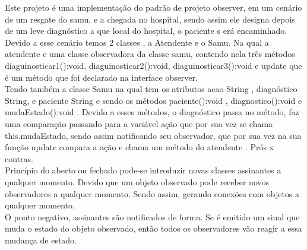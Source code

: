 \documentclass[a4paper]{article}
\begin{document}
          Este projeto é uma implementação do padrão de projeto observer, em um 
          cenário de um resgate do samu, e a chegada no hospital, sendo assim ele
          designa depois de um leve diagnóstico a que local do hospital, o paciente s
          erá encaminhado.\\
          Devido a esse cenário temos 2 classes , a Atendente e o Samu. Na qual a 
          atendente e uma classe observadora da classe samu, contendo nela três métodos
          diaguinosticar1():void, diaguinosticar2():void, diaguinosticar3():void e 
          update que é um método que foi declarado na interface observer. \\
          Tendo também a classe Samu na qual tem os atributos acao String , 
          diagnóstico String, e paciente String e sendo os métodos paciente():void , diagnostico():void e mudaEstado():void . Devido a esses métodos, o diagnóstico passa no método, faz uma comparação passando para a variável ação que por sua vez se chama this.mudaEstado, sendo assim notificando seu observador, que por sua vez na sua função update compara a ação e chama um método do atendente .
          Prós x contras.\\
          Princípio  do aberto ou fechado pode-se introduzir novas classes 
          assinantes a qualquer momento. Devido que um objeto observado pode 
          receber novos observadores a qualquer momento. Sendo assim, gerando 
          conexões com objetos a qualquer momento. \\
          O ponto negativo, assinantes são notificados de forma. 
          Se é emitido um sinal que muda o estado do objeto observado, então 
          todos os observadores vão reagir a essa mudança de estado.
\end{document}
